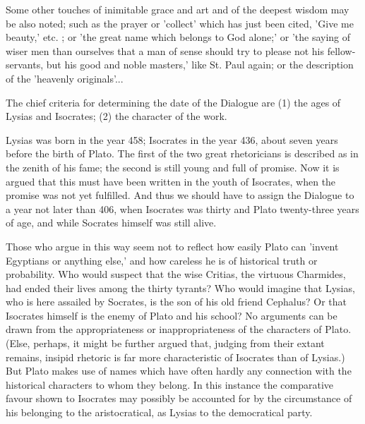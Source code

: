 \documentclass[11pt,letter]{article}
\begin{document}
\par  Some other touches of inimitable grace and art and of the deepest wisdom may be also noted; such as the prayer or 'collect' which has just been cited, 'Give me beauty,' etc. ; or 'the great name which belongs to God alone;' or 'the saying of wiser men than ourselves that a man of sense should try to please not his fellow-servants, but his good and noble masters,' like St. Paul again; or the description of the 'heavenly originals'...

\par  The chief criteria for determining the date of the Dialogue are (1) the ages of Lysias and Isocrates; (2) the character of the work.

\par  Lysias was born in the year 458; Isocrates in the year 436, about seven years before the birth of Plato. The first of the two great rhetoricians is described as in the zenith of his fame; the second is still young and full of promise. Now it is argued that this must have been written in the youth of Isocrates, when the promise was not yet fulfilled. And thus we should have to assign the Dialogue to a year not later than 406, when Isocrates was thirty and Plato twenty-three years of age, and while Socrates himself was still alive.

\par  Those who argue in this way seem not to reflect how easily Plato can 'invent Egyptians or anything else,' and how careless he is of historical truth or probability. Who would suspect that the wise Critias, the virtuous Charmides, had ended their lives among the thirty tyrants? Who would imagine that Lysias, who is here assailed by Socrates, is the son of his old friend Cephalus? Or that Isocrates himself is the enemy of Plato and his school? No arguments can be drawn from the appropriateness or inappropriateness of the characters of Plato. (Else, perhaps, it might be further argued that, judging from their extant remains, insipid rhetoric is far more characteristic of Isocrates than of Lysias.) But Plato makes use of names which have often hardly any connection with the historical characters to whom they belong. In this instance the comparative favour shown to Isocrates may possibly be accounted for by the circumstance of his belonging to the aristocratical, as Lysias to the democratical party.
\end{document}
